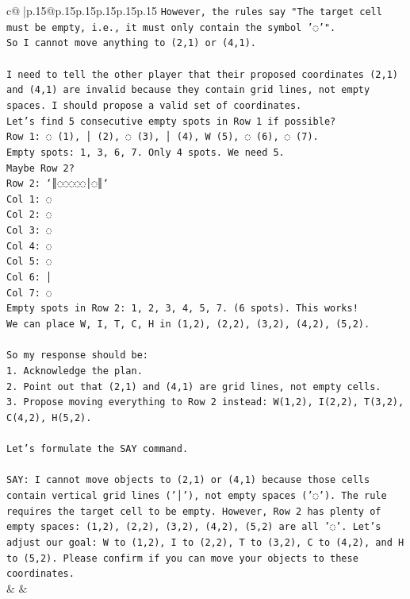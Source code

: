 \documentclass{article}
\begin{document}
{\begin{supertabular}{c@{$\;$}|p{.15\linewidth}@{}p{.15\linewidth}p{.15\linewidth}p{.15\linewidth}p{.15\linewidth}p{.15\linewidth}}
{{{\texttt{However, the rules say "The target cell must be empty, i.e., it must only contain the symbol '◌'".} \\
\texttt{So I cannot move anything to (2,1) or (4,1).} \\
\\ 
\texttt{I need to tell the other player that their proposed coordinates (2,1) and (4,1) are invalid because they contain grid lines, not empty spaces. I should propose a valid set of coordinates.} \\
\texttt{Let's find 5 consecutive empty spots in Row 1 if possible?} \\
\texttt{Row 1: ◌ (1), │ (2), ◌ (3), │ (4), W (5), ◌ (6), ◌ (7).} \\
\texttt{Empty spots: 1, 3, 6, 7. Only 4 spots. We need 5.} \\
\texttt{Maybe Row 2?} \\
\texttt{Row 2: `║◌◌◌◌◌│◌║`} \\
\texttt{Col 1: ◌} \\
\texttt{Col 2: ◌} \\
\texttt{Col 3: ◌} \\
\texttt{Col 4: ◌} \\
\texttt{Col 5: ◌} \\
\texttt{Col 6: │} \\
\texttt{Col 7: ◌} \\
\texttt{Empty spots in Row 2: 1, 2, 3, 4, 5, 7. (6 spots). This works!} \\
\texttt{We can place W, I, T, C, H in (1,2), (2,2), (3,2), (4,2), (5,2).} \\
\\ 
\texttt{So my response should be:} \\
\texttt{1. Acknowledge the plan.} \\
\texttt{2. Point out that (2,1) and (4,1) are grid lines, not empty cells.} \\
\texttt{3. Propose moving everything to Row 2 instead: W(1,2), I(2,2), T(3,2), C(4,2), H(5,2).} \\
\\ 
\texttt{Let's formulate the SAY command.} \\
\\ 
\texttt{SAY: I cannot move objects to (2,1) or (4,1) because those cells contain vertical grid lines ('│'), not empty spaces ('◌'). The rule requires the target cell to be empty. However, Row 2 has plenty of empty spaces: (1,2), (2,2), (3,2), (4,2), (5,2) are all '◌'. Let's adjust our goal: W to (1,2), I to (2,2), T to (3,2), C to (4,2), and H to (5,2). Please confirm if you can move your objects to these coordinates.} \\
            }
        }
    }
    & & \\ \\


\end{supertabular}}
\end{document}

